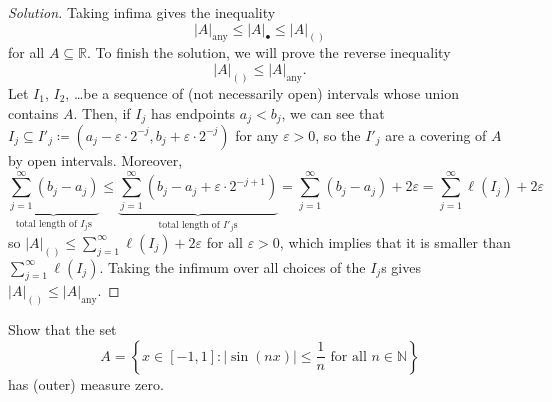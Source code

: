 \documentclass[11pt]{article}
\providecommand{\eps}{\varepsilon}
\providecommand{\NN}{\mathbb N}
\providecommand{\RR}{\mathbb R}
\newenvironment{soln}{\begin{proof}[Solution]}{\end{proof}}
\providecommand{\abs}[1]{\left|#1\right|}
\begin{document}
\begin{soln}
    Taking infima gives the inequality
    \begin{equation*}
	\abs{A}_{\text{any}}\le \abs{A}_{\bullet}\le \abs{A}_{()}
    \end{equation*}
    for all $A\subseteq\RR$.
    To finish the solution, we will prove the reverse inequality
    \begin{equation*}
	\abs{A}_{()}\le \abs{A}_{\text{any}}.
    \end{equation*}
    Let $I_1$, $I_2$, \dots be a sequence of (not necessarily open) intervals
    whose union contains $A$. Then, if $I_j$ has endpoints $a_j < b_j$,
    we can see that
    $I_j\subseteq I'_j\coloneq(a_j-\eps\cdot 2^{-j}, b_j+\eps\cdot 2^{-j})$
    for any $\eps>0$, so the $I'_j$ are a covering of $A$ by open intervals.
    Moreover,
    \begin{equation*}
	\underbrace{\sum_{j=1}^\infty (b_j-a_j)}_{\text{total length of $I_j$s}}
	\le \underbrace{\sum_{j=1}^\infty (b_j-a_j + \eps\cdot 2^{-j+1})}_
	{{\text{total length of $I'_j$s}}}
	= \sum_{j=1}^\infty (b_j-a_j) + 2\eps
	= \sum_{j=1}^\infty \ell(I_j) + 2\eps
    \end{equation*}
    so $\abs{A}_{()}\le \sum_{j=1}^\infty\ell(I_j) + 2\eps$
    for all $\eps > 0$, which implies that it is smaller than
    $\sum_{j=1}^\infty\ell(I_j)$. Taking the infimum over
    all choices of the $I_j$s gives $\abs{A}_{()}\le\abs{A}_{\text{any}}$.
\end{soln}

\pagebreak

\begin{problem}
    Show that the set
    \begin{equation*}
	A = \left\{ x\in[-1,1] : |\sin(nx)| \le \frac 1n
	\text{ for all } n\in\NN \right\}
    \end{equation*}
    has (outer) measure zero.
\end{problem}
\end{document}
